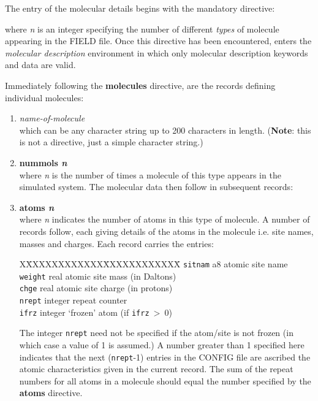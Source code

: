 The entry of the molecular details begins with the mandatory
directive:


\noindent where {\em n} is an integer specifying the number of
different {\em types} of molecule appearing in the FIELD file.
Once this directive has been encountered, \D enters the {\em
molecular description} environment in which only molecular
description keywords and data are valid.

Immediately following the {\bf molecules} directive, are the records
defining individual molecules:

\begin{enumerate}

\item {\em name-of-molecule} \\
which can be any character string up to 200 characters in length.
({\bf Note}: this is not a directive, just a simple character string.)

\item {\bf nummols {\em n}} \\
where {\em n} is the number of times a molecule of this type
appears in the simulated system.  The molecular data then follow
in subsequent records:

\item {\bf atoms {\em n}} \\
where {\em n} indicates the number of atoms in this type of
molecule.  A number of records follow, each giving details of the
atoms in the molecule i.e. site names, masses and charges.  Each
record carries the entries:
\begin{tabbing}
X\=XXXXXXXXXXXX\=XXXXXXXXXXXX\=\kill
\> {\tt sitnam} \> a8      \> atomic site name \\
\> {\tt weight} \> real    \> atomic site mass (in Daltons) \\
\> {\tt chge}   \> real    \> atomic site charge (in protons) \\
\> {\tt nrept}  \> integer \> repeat counter \\
\> {\tt ifrz}   \> integer \> `frozen' atom (if {\tt ifrz}$~>~0$)
\end{tabbing}
The integer {\tt nrept} need not be specified if the atom/site is
not frozen (in which case a value of 1 is assumed.)  A number
greater than 1 specified here indicates that the next ({\tt nrept}-1)
entries in the CONFIG file are ascribed the atomic
characteristics given in the current record.  The sum of the
repeat numbers for all atoms in a molecule should equal the number
specified by the {\bf atoms} directive.


\end{enumerate}
